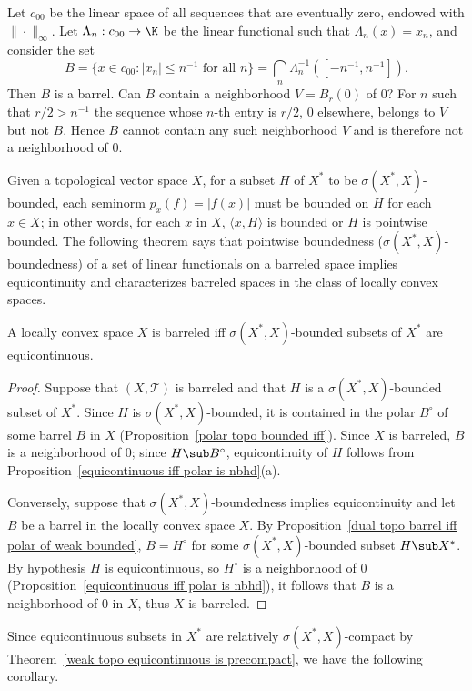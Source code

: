 \begin{example}\label{c_00 nonbarreled}
Let $c_{00}$ be the linear space of all sequences that are eventually zero, endowed with $\|\cdot\|_\infty$. Let $\Lambda_n:c_{00}\to\K$ be the linear functional such that $\Lambda_n(x)=x_n$, and consider the set
\[B=\{x\in c_{00}:|x_n|\leq n^{-1}\text{ for all $n$}\}=\bigcap_n\Lambda_n^{-1}([-n^{-1},n^{-1}]).\]
Then $B$ is a barrel. Can $B$ contain a neighborhood $V=B_r(0)$ of $0$? For $n$ such that $r/2>n^{-1}$ the sequence whose $n$-th entry is $r/2$, $0$ elsewhere, belongs to $V$ but not $B$. Hence $B$ cannot contain any such neighborhood $V$ and is therefore not a neighborhood of $0$.
\end{example}
Given a topological vector space $X$, for a subset $H$ of $X^*$ to be $\sigma(X^*,X)$-bounded, each seminorm $p_x(f)=|f(x)|$ must be bounded on $H$ for each $x\in X$; in other words, for each $x$ in $X$, $\langle x,H\rangle$ is bounded or $H$ is pointwise bounded. The following theorem says that pointwise boundedness ($\sigma(X^*,X)$-boundedness) of a set of linear functionals on a barreled space implies equicontinuity and characterizes barreled spaces in the class of locally convex spaces.
\begin{theorem}\label{Banach-Steinhaus for linear functional}
A locally convex space $X$ is barreled iff $\sigma(X^*,X)$-bounded subsets of $X^*$ are equicontinuous.
\end{theorem}
\begin{proof}
Suppose that $(X,\mathcal{T})$ is barreled and that $H$ is a $\sigma(X^*,X)$-bounded subset of $X^*$. Since $H$ is $\sigma(X^*,X)$-bounded, it is contained in the polar $B^\circ$ of some barrel $B$ in $X$ (Proposition~\ref{polar topo bounded iff}). Since $X$ is barreled, $B$ is a neighborhood of $0$; since $H\sub B^\circ$, equicontinuity of $H$ follows from Proposition~\ref{equicontinuous iff polar is nbhd}(a).\par
Conversely, suppose that $\sigma(X^*,X)$-boundedness implies equicontinuity and let $B$ be a barrel in the locally convex space $X$. By Proposition~\ref{dual topo barrel iff polar of weak bounded}, $B=H^\circ$ for some $\sigma(X^*,X)$-bounded subset $H\sub X^*$. By hypothesis $H$ is equicontinuous, so $H^\circ$ is a neighborhood of $0$ (Proposition~\ref{equicontinuous iff polar is nbhd}), it follows that $B$ is a neighborhood of $0$ in $X$, thus $X$ is barreled.
\end{proof}
Since equicontinuous subsets in $X^*$ are relatively $\sigma(X^*,X)$-compact by Theorem~\ref{weak topo equicontinuous is precompact}, we have the following corollary.
